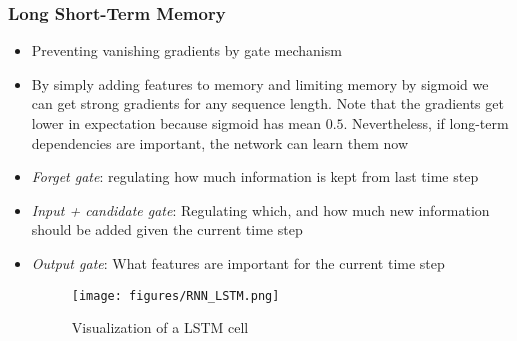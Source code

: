 \subsubsection{Long Short-Term Memory}
\begin{itemize}
	\item Preventing vanishing gradients by gate mechanism
	\item By simply adding features to memory and limiting memory by sigmoid we can get strong gradients for any sequence length. Note that the gradients get lower in expectation because sigmoid has mean $0.5$. Nevertheless, if long-term dependencies are important, the network can learn them now
	\item \textit{Forget gate}: regulating how much information is kept from last time step
	\item \textit{Input + candidate gate}: Regulating which, and how much new information should be added given the current time step
	\item \textit{Output gate}: What features are important for the current time step
	\begin{figure}[ht!]
		\centering
		\texttt{[image: figures/RNN\_LSTM.png]}
		\caption{Visualization of a LSTM cell}
		\label{fig:RNN_LSTM}
	\end{figure}
\end{itemize}
